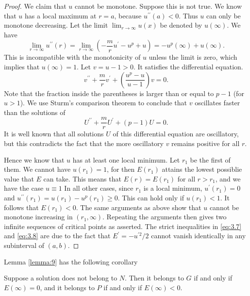 \begin{proof}
  We claim that $u$ cannot be monotone. Suppose this is not true.
  We know that $u$ has a local maximum at $r=a$, because $u^{\prime \prime}(a)<0$.
  Thus $u$ can only be monotone decreasing.
  Let the limit $\lim _{r \rightarrow \infty} u(x)$ be denoted by $u(\infty)$.
  We have
  \[
    \lim _{r \rightarrow \infty} u^{\prime \prime}(r)
      = \lim _{r \rightarrow \infty}\left(-\frac{m}{r} u^{\prime}-u^p+u\right)
      = -u^p(\infty)+u(\infty).
  \]
  This is incompatible with the monotonicity of $u$ unless the limit is zero,
  which implies that $u(\infty)=1$. Let $v=u-1>0$. It satisfies the differential equation.
  \[
    v^{\prime \prime}+\frac{m}{r} v^{\prime}+\left(\frac{u^p-u}{u-1}\right) v = 0.
  \]
  Note that the fraction inside the parentheses is
  larger than or equal to $p-1$ (for $u>1$).
  We use Sturm's comparison theorem to conclude that $v$ oscillates
  faster than the solutions of
  \[
    U^{\prime \prime}+\frac{m}{r} U^{\prime}+(p-1) U=0 .
  \]
  It is well known that all solutions $U$ of this differential equation are oscillatory,
  but this contradicts the fact that the more oscillatory $v$ remains positive
  for all $r$.

  Hence we know that $u$ has at least one local minimum. Let $r_1$ be the first of them.
  We cannot have $u\left(r_1\right)=1$, for then $E\left(r_1\right)$ attains the lowest
  possiblie value that $E$ can take. This means that $E(r)=E\left(r_1\right)$ for all $r>r_1$,
  and we have the case $u \equiv 1$ In all other cases, since $r_1$ is a local minimum,
  $u^{\prime}\left(r_1\right)=0$ and 
  $u^{\prime \prime}\left(r_1\right)=u\left(r_1\right)-u^p\left(r_1\right) \geq 0$.
  This can hold only if $u\left(r_1\right)<1$. It follows that $E\left(r_1\right)<0$.
  The same arguments as above show that $u$ cannot be monotone increasing
  in $\left(r_1, \infty\right)$.
  Repeating the arguments then gives two infinite sequences of critical points as asserted.
  The strict inequalities in \eqref{eq:3.7} and \eqref{eq:3.8} are due to the fact
  that $E^{\prime}=-u^{\prime 2} / 2$ cannot vanish identically
  in any subinterval of $(a, b)$.
\end{proof}

Lemma \ref{lemma:9} has the following corollary


\begin{lemma}\label{lemma:10}
  Suppose a solution does not belong to $N$. Then it belongs to $G$ if and only if $E(\infty)=0$, and it belongs to $P$ if and only if $E(\infty)<0$.
\end{lemma}

